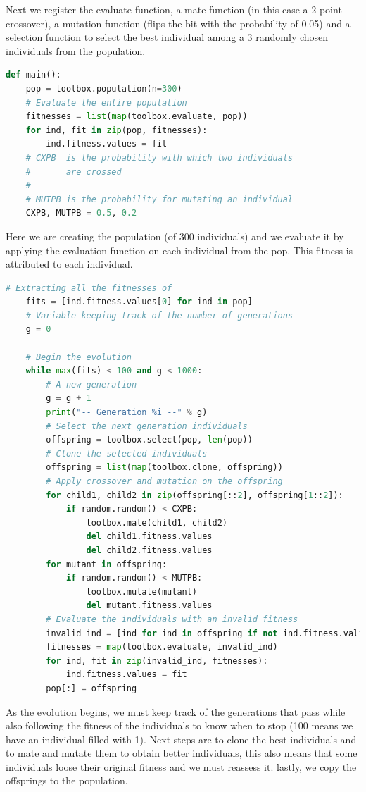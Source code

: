 \documentclass[a4paper,12pt]{report}
\begin{document}
Next we register the evaluate function, a mate function (in this case a 2 point crossover), a mutation function (flips the bit with the probability of 0.05) and a selection function to select the best individual among a 3 randomly chosen individuals from the population.

\begin{lstlisting}[language=Python]
def main():
    pop = toolbox.population(n=300)
    # Evaluate the entire population
    fitnesses = list(map(toolbox.evaluate, pop))
    for ind, fit in zip(pop, fitnesses):
        ind.fitness.values = fit
    # CXPB  is the probability with which two individuals
    #       are crossed
    #
    # MUTPB is the probability for mutating an individual
    CXPB, MUTPB = 0.5, 0.2
\end{lstlisting}

Here we are creating the population (of 300 individuals) and we evaluate it by applying the evaluation function on each individual from the pop. This fitness is attributed to each individual.

\begin{lstlisting}[language=Python]
# Extracting all the fitnesses of 
    fits = [ind.fitness.values[0] for ind in pop]
    # Variable keeping track of the number of generations
    g = 0
    
    # Begin the evolution
    while max(fits) < 100 and g < 1000:
        # A new generation
        g = g + 1
        print("-- Generation %i --" % g)
        # Select the next generation individuals
        offspring = toolbox.select(pop, len(pop))
        # Clone the selected individuals
        offspring = list(map(toolbox.clone, offspring))
        # Apply crossover and mutation on the offspring
        for child1, child2 in zip(offspring[::2], offspring[1::2]):
            if random.random() < CXPB:
                toolbox.mate(child1, child2)
                del child1.fitness.values
                del child2.fitness.values
        for mutant in offspring:
            if random.random() < MUTPB:
                toolbox.mutate(mutant)
                del mutant.fitness.values
        # Evaluate the individuals with an invalid fitness
        invalid_ind = [ind for ind in offspring if not ind.fitness.valid]
        fitnesses = map(toolbox.evaluate, invalid_ind)
        for ind, fit in zip(invalid_ind, fitnesses):
            ind.fitness.values = fit
        pop[:] = offspring
\end{lstlisting}

As the evolution begins, we must keep track of the generations that pass while also following the fitness of the individuals to know when to stop (100 means we have an individual filled with 1). Next steps are to clone the best individuals and to mate and mutate them to obtain better individuals, this also means that some individuals loose their original fitness and we must reassess it. lastly, we copy the offsprings to the population.
\end{document}
